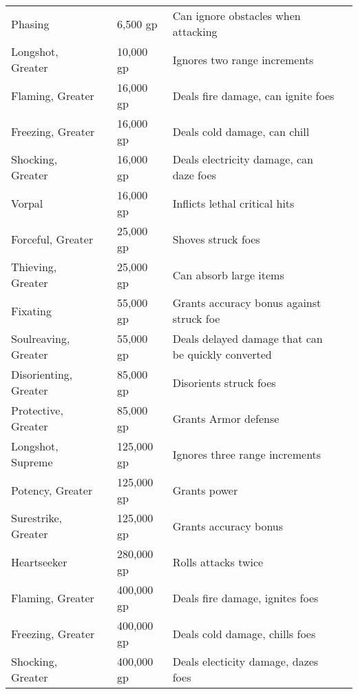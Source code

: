 \begin{longtabuwrapper}
\begin{longtabu}{l l l X l}
Phasing &  & 6,500 gp & Can ignore obstacles when attacking & \pageref{item:Phasing} \\
Longshot, Greater &  & 10,000 gp & Ignores two range increments & \pageref{item:Longshot, Greater} \\
Flaming, Greater &  & 16,000 gp & Deals fire damage, can ignite foes & \pageref{item:Flaming, Greater} \\
Freezing, Greater &  & 16,000 gp & Deals cold damage, can chill & \pageref{item:Freezing, Greater} \\
Shocking, Greater &  & 16,000 gp & Deals electricity damage, can daze foes & \pageref{item:Shocking, Greater} \\
Vorpal &  & 16,000 gp & Inflicts lethal critical hits & \pageref{item:Vorpal} \\
Forceful, Greater &  & 25,000 gp & Shoves struck foes & \pageref{item:Forceful, Greater} \\
Thieving, Greater &  & 25,000 gp & Can absorb large items & \pageref{item:Thieving, Greater} \\
Fixating &  & 55,000 gp & Grants accuracy bonus against struck foe & \pageref{item:Fixating} \\
Soulreaving, Greater &  & 55,000 gp & Deals delayed damage that can be quickly converted & \pageref{item:Soulreaving, Greater} \\
Disorienting, Greater &  & 85,000 gp & Disorients struck foes & \pageref{item:Disorienting, Greater} \\
Protective, Greater &  & 85,000 gp & Grants  Armor defense & \pageref{item:Protective, Greater} \\
Longshot, Supreme &  & 125,000 gp & Ignores three range increments & \pageref{item:Longshot, Supreme} \\
Potency, Greater &  & 125,000 gp & Grants   power & \pageref{item:Potency, Greater} \\
Surestrike, Greater &  & 125,000 gp & Grants  accuracy bonus & \pageref{item:Surestrike, Greater} \\
Heartseeker &  & 280,000 gp & Rolls attacks twice & \pageref{item:Heartseeker} \\
Flaming, Greater &  & 400,000 gp & Deals fire damage, ignites foes & \pageref{item:Flaming, Greater} \\
Freezing, Greater &  & 400,000 gp & Deals cold damage, chills foes & \pageref{item:Freezing, Greater} \\
Shocking, Greater &  & 400,000 gp & Deals electicity damage, dazes foes & \pageref{item:Shocking, Greater} \\
\end{longtabu}
\end{longtabuwrapper}
